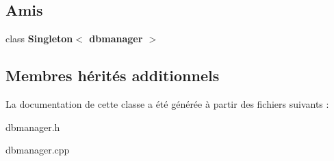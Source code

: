 \subsection*{Amis}
\begin{DoxyCompactItemize}
\item 
\hypertarget{classdbmanager_af8de2880270e7199a9802839897b9c7d}{class {\bfseries Singleton$<$ dbmanager $>$}}\label{classdbmanager_af8de2880270e7199a9802839897b9c7d}

\end{DoxyCompactItemize}
\subsection*{Membres hérités additionnels}


La documentation de cette classe a été générée à partir des fichiers suivants \+:\begin{DoxyCompactItemize}
\item 
dbmanager.\+h\item 
dbmanager.\+cpp\end{DoxyCompactItemize}
